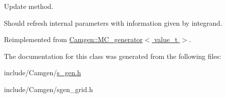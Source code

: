 Update method. 

Should refresh internal parameters with information given by integrand. 

Reimplemented from \hyperlink{a00362_ae5e70cee65aacbb6a556057de02ef3dd}{Camgen\-::\-M\-C\-\_\-generator$<$ value\-\_\-t $>$}.



The documentation for this class was generated from the following files\-:\begin{DoxyCompactItemize}
\item 
include/\-Camgen/\hyperlink{a00735}{s\-\_\-gen.\-h}\item 
include/\-Camgen/sgen\-\_\-grid.\-h\end{DoxyCompactItemize}
